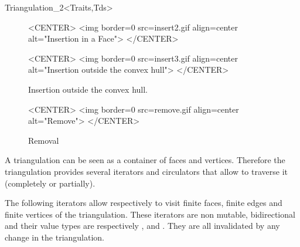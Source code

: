 \begin{ccClassTemplate}{Triangulation_2<Traits,Tds>}
\begin{figure}
\begin{ccHtmlOnly}
<CENTER>
<img border=0 src=insert2.gif align=center alt="Insertion in a Face">
</CENTER>
\end{ccHtmlOnly}
\end{figure}


\begin{figure}
\begin{ccTexOnly}
\begin{center}

\end{center}
\end{ccTexOnly}
\caption{Insertion outside the convex hull.
\label{I1_Fig_insert3}}

\begin{ccHtmlOnly}
<CENTER>
<img border=0 src=insert3.gif align=center alt="Insertion outside the
convex hull">
</CENTER>
\end{ccHtmlOnly}
\end{figure}

\begin{figure}
\begin{ccTexOnly}
\begin{center}

\end{center}
\end{ccTexOnly}
\caption{Removal
\label{I1_Fig_remove}}

\begin{ccHtmlOnly}
<CENTER>
<img border=0 src=remove.gif align=center alt="Remove">
</CENTER>
\end{ccHtmlOnly}
\end{figure}




A triangulation can be seen as a container of faces and vertices.
Therefore the triangulation provides several iterators and circulators
that allow to traverse it (completely or partially).




The following iterators allow respectively to visit 
finite faces,  finite edges and  finite vertices
of the triangulation. These iterators are non mutable, bidirectional
and their value types are respectively
,  and . 
They are all invalidated by any change in the triangulation.

\ccGlue
{}


\end{ccClassTemplate}
